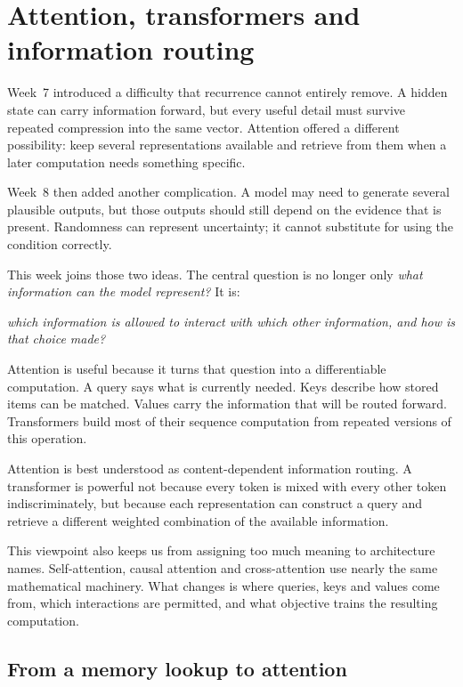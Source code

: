 \chapter{Attention, transformers and information routing}
\label{chap:week09}

Week~7 introduced a difficulty that recurrence cannot entirely remove. A hidden state can carry information forward, but every useful detail must survive repeated compression into the same vector. Attention offered a different possibility: keep several representations available and retrieve from them when a later computation needs something specific.

Week~8 then added another complication. A model may need to generate several plausible outputs, but those outputs should still depend on the evidence that is present. Randomness can represent uncertainty; it cannot substitute for using the condition correctly.

This week joins those two ideas. The central question is no longer only \emph{what information can the model represent?} It is:
\begin{center}
  \emph{which information is allowed to interact with which other information, and how is that choice made?}
\end{center}

Attention is useful because it turns that question into a differentiable computation. A query says what is currently needed. Keys describe how stored items can be matched. Values carry the information that will be routed forward. Transformers build most of their sequence computation from repeated versions of this operation.

\begin{keyidea}
Attention is best understood as content-dependent information routing. A transformer is powerful not because every token is mixed with every other token indiscriminately, but because each representation can construct a query and retrieve a different weighted combination of the available information.
\end{keyidea}

This viewpoint also keeps us from assigning too much meaning to architecture names. Self-attention, causal attention and cross-attention use nearly the same mathematical machinery. What changes is where queries, keys and values come from, which interactions are permitted, and what objective trains the resulting computation.

\section{From a memory lookup to attention}

